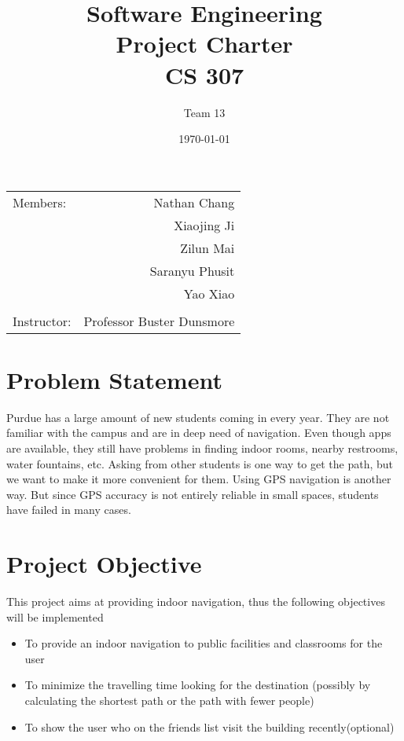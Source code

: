 \documentclass{article}
\title{Software Engineering \\ Project Charter \\ CS 307} %
\author{Team \textsc{13}} %
\date{\today} %
\begin{document}
\maketitle %

\begin{center}
\begin{tabular}{l r}
Members: & Nathan Chang \\ %
& Xiaojing Ji \\
& Zilun Mai \\
& Saranyu Phusit \\
& Yao Xiao \\
\\



Instructor: & Professor Buster Dunsmore %
\end{tabular}
\end{center}




\newpage
\section{Problem Statement}

Purdue has a large amount of new students coming in every year. They are not familiar with the campus and are in deep need of navigation. Even though apps are available, they still have problems in finding indoor rooms, nearby restrooms, water fountains, etc. Asking from other students is one way to get the path, but we want to make it more convenient for them. Using GPS navigation is another way. But since GPS accuracy is not entirely reliable in small spaces, students have failed in many cases.

\section{Project Objective}

This project aims at providing indoor navigation, thus the following objectives will be implemented
\begin{itemize}
\item To provide an indoor navigation to public facilities and classrooms for the user
\item To minimize the travelling time looking for the destination (possibly by calculating the shortest path or the path with fewer people)
\item To show the user who on the friends list visit the building recently(optional)
\end{itemize}
\end{document}
